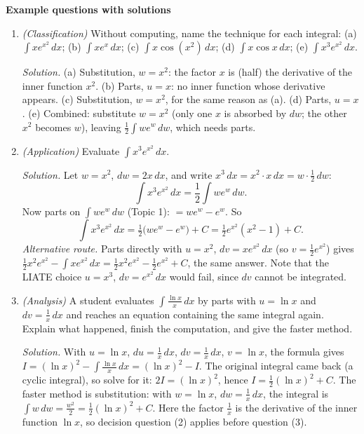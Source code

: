 \documentclass[11pt]{article}
\begin{document}
\textbf{Example questions with solutions}
\begin{enumerate}
\item \emph{(Classification)} Without computing, name the technique for each integral: (a) $\int xe^{x^2}\,dx$; (b) $\int xe^{x}\,dx$; (c) $\int x\cos(x^2)\,dx$; (d) $\int x\cos x\,dx$; (e) $\int x^3e^{x^2}\,dx$.

\textit{Solution.} (a) Substitution, $w=x^2$: the factor $x$ is (half) the derivative of the inner function $x^2$. (b) Parts, $u=x$: no inner function whose derivative appears. (c) Substitution, $w=x^2$, for the same reason as (a). (d) Parts, $u=x$. (e) Combined: substitute $w=x^2$ (only one $x$ is absorbed by $dw$; the other $x^2$ becomes $w$), leaving $\frac12\int we^w\,dw$, which needs parts.

\item \emph{(Application)} Evaluate $\displaystyle\int x^3e^{x^2}\,dx$.

\textit{Solution.} Let $w=x^2$, $dw=2x\,dx$, and write $x^3\,dx = x^2\cdot x\,dx = w\cdot\frac12\,dw$:
\[ \int x^3e^{x^2}\,dx = \frac12\int we^w\,dw. \]
Now parts on $\int we^w\,dw$ (Topic 1): $=we^w - e^w$. So
\[ \int x^3e^{x^2}\,dx = \tfrac12\big(we^w - e^w\big) + C = \tfrac12e^{x^2}(x^2-1) + C. \]
\emph{Alternative route.} Parts directly with $u=x^2$, $dv=xe^{x^2}\,dx$ (so $v=\frac12e^{x^2}$) gives $\frac12x^2e^{x^2} - \int xe^{x^2}\,dx = \frac12x^2e^{x^2} - \frac12e^{x^2} + C$, the same answer. Note that the LIATE choice $u=x^3$, $dv=e^{x^2}\,dx$ would fail, since $dv$ cannot be integrated.

\item \emph{(Analysis)} A student evaluates $\int\frac{\ln x}{x}\,dx$ by parts with $u=\ln x$ and $dv=\frac1x\,dx$ and reaches an equation containing the same integral again. Explain what happened, finish the computation, and give the faster method.

\textit{Solution.} With $u=\ln x$, $du=\frac1x\,dx$, $dv=\frac1x\,dx$, $v=\ln x$, the formula gives $I=(\ln x)^2 - \int\frac{\ln x}{x}\,dx = (\ln x)^2 - I$. The original integral came back (a cyclic integral), so solve for it: $2I=(\ln x)^2$, hence $I=\frac12(\ln x)^2+C$. The faster method is substitution: with $w=\ln x$, $dw=\frac1x\,dx$, the integral is $\int w\,dw=\frac{w^2}{2}=\frac12(\ln x)^2+C$. Here the factor $\frac1x$ is the derivative of the inner function $\ln x$, so decision question (2) applies before question (3).
\end{enumerate}
\end{document}
